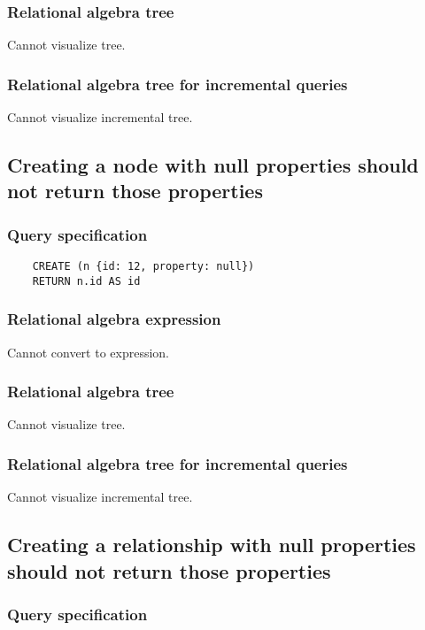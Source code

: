 	\subsubsection*{Relational algebra tree}

	Cannot visualize tree.

	\subsubsection*{Relational algebra tree for incremental queries}

	Cannot visualize incremental tree.
	\subsection{Creating a node with null properties should not return those properties}

	\subsubsection*{Query specification}

	\begin{lstlisting}
	CREATE (n {id: 12, property: null})
	RETURN n.id AS id
	\end{lstlisting}


	\subsubsection*{Relational algebra expression}

	Cannot convert to expression.

	\subsubsection*{Relational algebra tree}

	Cannot visualize tree.

	\subsubsection*{Relational algebra tree for incremental queries}

	Cannot visualize incremental tree.
	\subsection{Creating a relationship with null properties should not return those properties}

	\subsubsection*{Query specification}

